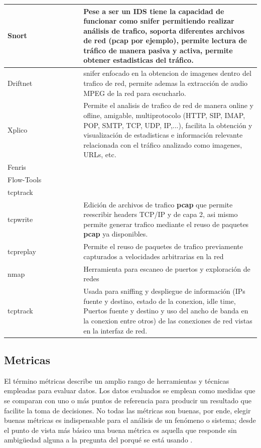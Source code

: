 \documentclass[12pt]{article}
\begin{document}
\begin{table}[htbp]
\begin{tabular}{|p{0.3\linewidth}|p{0.7\linewidth}|}
Snort & 
Pese a ser un IDS tiene la capacidad de funcionar como snifer permitiendo realizar análisis de trafico, soporta diferentes archivos de red (pcap por ejemplo), permite lectura de tráfico de manera pasiva y activa, permite obtener estadisticas del tráfico.
\tabularnewline \hline

Driftnet & 
snifer enfocado en la obtencion de imagenes dentro del trafico de red, permite ademas la extracción de audio MPEG de la red para escucharlo.
\tabularnewline \hline

Xplico & 
Permite el analisis de trafico de red de manera online y ofline, amigable, multiprotocolo (HTTP, SIP, IMAP, POP, SMTP, TCP, UDP, IP,...), facilita la obtención y visualización de estadisticas e información relevante relacionada con el tráfico analizado como imagenes, URLs, etc.
\tabularnewline \hline

Fenris & 

\tabularnewline \hline

Flow-Tools & 

\tabularnewline \hline

tcptrack & 

\tabularnewline \hline

tcpwrite & 
Edición de archivos de trafico \textbf{pcap} que permite reescribir headers TCP/IP y de capa 2, asi mismo permite generar trafico mediante el reuso de paquetes \textbf{pcap} ya disponibles. 
\tabularnewline \hline

tcpreplay &  
Permite el reuso de paquetes de trafico previamente capturados a velocidades arbitrarias en la red\tabularnewline \hline
nmap & Herramienta para escaneo de puertos y exploración de redes \tabularnewline \hline
tcptrack & Usada para sniffing y despliegue de información (IPs fuente y destino, estado de la conexion, idle time, Puertos fuente y destino y uso del ancho de banda en la conexion entre otros) de las conexiones de red vistas en la interfaz de red.   \tabularnewline \hline

\end{tabular}
\end{table}


\subsection{Metricas}

El término métricas describe un amplio rango de herramientas y técnicas empleadas para evaluar datos. Los datos evaluados se emplean como medidas que se comparan con uno o más puntos de referencia para producir un resultado que facilite la toma de decisiones. No todas las métricas son buenas, por ende, elegir buenas métricas es indispensable para el análisis de un fenómeno o sistema; desde el punto de vista más básico una buena métrica es aquella que responde sin ambigüedad alguna a la pregunta del porqué se está usando \citep{sans_ids_metrics}.
\end{document}
